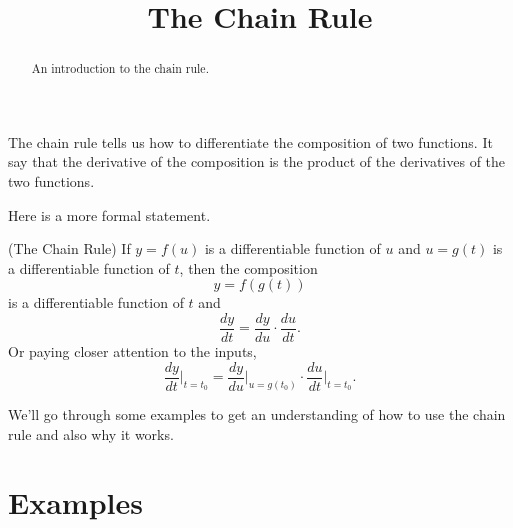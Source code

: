 \documentclass{ximera}
\title{The Chain Rule}
\begin{document}
\begin{abstract}
An introduction to the chain rule.
\end{abstract}
\maketitle


The chain rule tells us how to differentiate the composition of two functions. It say that the derivative of the composition is the product of the derivatives of the two functions.

Here is a more formal statement.

\begin{theorem}
(The Chain Rule) If $y=f(u)$ is a differentiable function of $u$ and $u=g(t)$ is a differentiable function of $t$, then the composition
\[
      y = f(g(t))
\]
is a differentiable function of $t$ and
\[
   \frac{dy}{dt} = \frac{dy}{du} \cdot \frac{du}{dt} .
\]
Or paying closer attention to the inputs,
\[
      \frac{dy}{dt}\Big|_{t=t_0} = \frac{dy}{du}\Big|_{u=g(t_0)} \cdot \frac{du}{dt}\Big|_{t=t_0} . 
\]

\end{theorem}


We'll go through some examples to get an understanding of how to use the chain rule and also why it works.


\section*{Examples}
\end{document}
